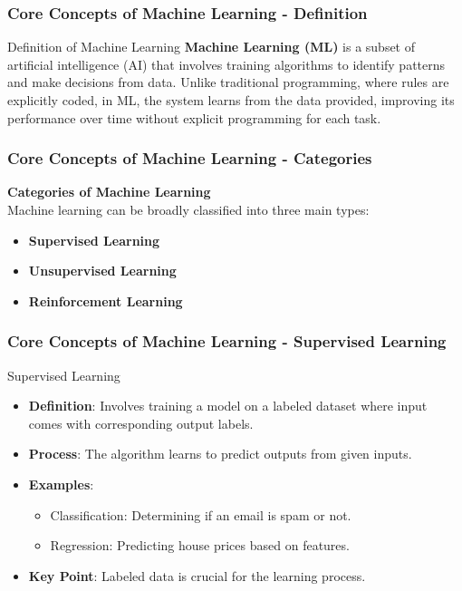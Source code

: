 \documentclass{beamer}
\begin{document}
\begin{frame}[fragile]
    \frametitle{Core Concepts of Machine Learning - Definition}
    \begin{block}{Definition of Machine Learning}
        \textbf{Machine Learning (ML)} is a subset of artificial intelligence (AI) that involves training algorithms to identify patterns and make decisions from data. Unlike traditional programming, where rules are explicitly coded, in ML, the system learns from the data provided, improving its performance over time without explicit programming for each task.
    \end{block}
\end{frame}

\begin{frame}[fragile]
    \frametitle{Core Concepts of Machine Learning - Categories}
    \textbf{Categories of Machine Learning}\\
    Machine learning can be broadly classified into three main types: 
    \begin{itemize}
        \item \textbf{Supervised Learning} 
        \item \textbf{Unsupervised Learning} 
        \item \textbf{Reinforcement Learning} 
    \end{itemize}
\end{frame}

\begin{frame}[fragile]
    \frametitle{Core Concepts of Machine Learning - Supervised Learning}
    \begin{block}{Supervised Learning}
        \begin{itemize}
            \item \textbf{Definition}: Involves training a model on a labeled dataset where input comes with corresponding output labels.
            \item \textbf{Process}: The algorithm learns to predict outputs from given inputs.
            \item \textbf{Examples}:
            \begin{itemize}
                \item Classification: Determining if an email is spam or not.
                \item Regression: Predicting house prices based on features.
            \end{itemize}
            \item \textbf{Key Point}: Labeled data is crucial for the learning process.
        \end{itemize}
    \end{block}
\end{frame}
\end{document}
